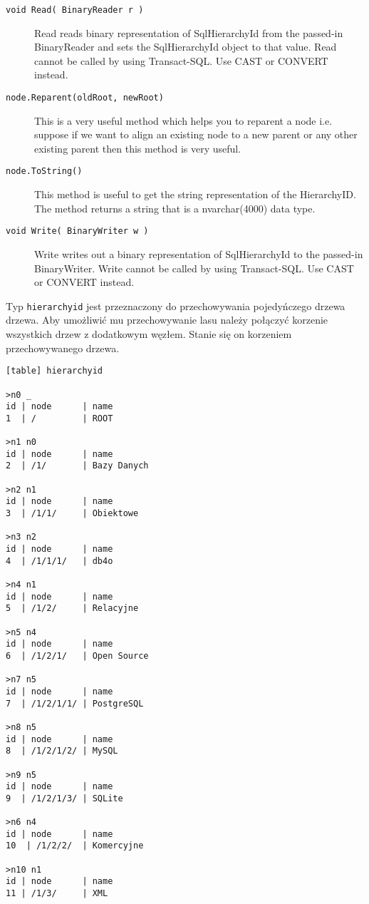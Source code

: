 \begin{description}
  \item[\texttt{void Read( BinaryReader r )}] 
	Read reads binary representation of SqlHierarchyId from the passed-in BinaryReader and sets the SqlHierarchyId object to that value. 
	Read cannot be called by using Transact-SQL. Use CAST or CONVERT instead.

  \item[\texttt{node.Reparent(oldRoot, newRoot)}] 
	This is a very useful method which helps you to reparent a node i.e. suppose if we want to align an existing node 
	to a new parent or any other existing parent then this method is very useful. 

  \item[\texttt{node.ToString()}] 
	This method is useful to get the string representation of the HierarchyID. 
	The method returns a string that is a nvarchar(4000) data type.


  \item[\texttt{void Write( BinaryWriter w )}] 
	Write writes out a binary representation of SqlHierarchyId to the passed-in BinaryWriter. 
	Write cannot be called by using Transact-SQL. Use CAST or CONVERT instead.

 \end{description}



Typ \texttt{hierarchyid} jest przeznaczony do przechowywania pojedyńczego drzewa drzewa.
Aby umożliwić mu przechowywanie lasu należy połączyć korzenie wszystkich drzew z dodatkowym węzłem.
Stanie się on korzeniem przechowywanego drzewa.

\begin{verbatim}[table] hierarchyid

>n0 _
id | node      | name
1  | /         | ROOT

>n1 n0
id | node      | name
2  | /1/       | Bazy Danych

>n2 n1
id | node      | name
3  | /1/1/     | Obiektowe

>n3 n2
id | node      | name
4  | /1/1/1/   | db4o

>n4 n1
id | node      | name
5  | /1/2/     | Relacyjne

>n5 n4
id | node      | name
6  | /1/2/1/   | Open Source

>n7 n5
id | node      | name
7  | /1/2/1/1/ | PostgreSQL

>n8 n5
id | node      | name
8  | /1/2/1/2/ | MySQL

>n9 n5
id | node      | name
9  | /1/2/1/3/ | SQLite

>n6 n4
id | node      | name
10  | /1/2/2/  | Komercyjne

>n10 n1
id | node      | name
11 | /1/3/     | XML

\end{verbatim}

